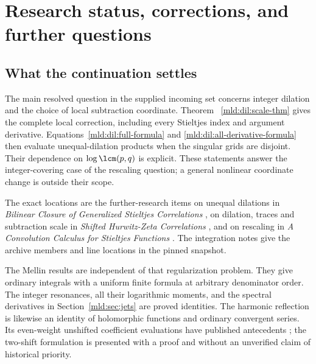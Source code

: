 \section{Research status, corrections, and further questions}
\label{mld:sec:research}

\subsection{What the continuation settles}

The main resolved question in the supplied incoming set concerns integer
dilation and the choice of local subtraction coordinate. Theorem~
\ref{mld:dil:scale-thm} gives the complete local correction, including every
Stieltjes index and argument derivative. Equations~\eqref{mld:dil:full-formula}
and \eqref{mld:dil:all-derivative-formula} then evaluate unequal-dilation
products when the singular grids are disjoint. Their dependence on
$\log\lcm(p,q)$ is explicit. These statements answer the integer-covering
case of the rescaling question; a general nonlinear coordinate change
is outside their scope.

The exact locations are the further-research items on unequal dilations
in \emph{Bilinear Closure of Generalized Stieltjes Correlations}
\cite{IncomingClosure}, on dilation, traces and subtraction scale in
\emph{Shifted Hurwitz-Zeta Correlations} \cite{IncomingShifted}, and on
rescaling in \emph{A Convolution Calculus for Stieltjes Functions}
\cite{IncomingCalculus}. The integration notes give the archive members
and line locations in the pinned snapshot.

The Mellin results are independent of that regularization problem.
They give ordinary integrals with a uniform finite formula at arbitrary
denominator order. The integer resonances, all their logarithmic moments,
and the spectral derivatives in Section~\ref{mld:sec:jets} are proved
identities. The harmonic reflection is likewise an identity of
holomorphic functions and ordinary convergent series. Its even-weight
unshifted coefficient evaluations have published antecedents
\cite{XuWang}; the two-shift formulation is presented with a proof and
without an unverified claim of historical priority.

